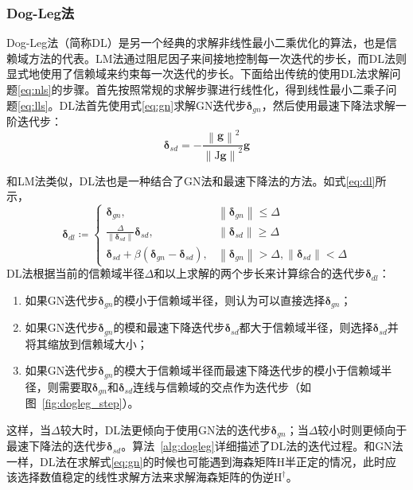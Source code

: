 \subsubsection*{Dog-Leg法}

Dog-Leg法（简称DL）是另一个经典的求解非线性最小二乘优化的算法，也是信赖域方法的代表。LM法通过阻尼因子来间接地控制每一次迭代的步长，而DL法则显式地使用了信赖域来约束每一次迭代的步长。下面给出传统的使用DL法求解问题\eqref{eq:nls}的步骤\citep{tingleff2004methods}。首先按照常规的求解步骤进行线性化，得到线性最小二乘子问题\eqref{eq:lls}。DL法首先使用式\eqref{eq:gn}求解GN迭代步$\bm{\delta}_{gn}$，然后使用最速下降法求解一阶迭代步：
\begin{equation}
    \bm{\delta}_{sd} = -\frac{\left\|\bm{g}\right\|^2}
                             {\left\|\mathrm{J}\bm{g}\right\|^2} \bm{g}
    \label{eq:sd}
\end{equation}

和LM法类似，DL法也是一种结合了GN法和最速下降法的方法。如式\eqref{eq:dl}所示，
\begin{equation}
    \bm{\delta}_{dl} \coloneqq \left\{
        \begin{array}{lll}
            \bm{\delta}_{gn}, & \left\|\bm{\delta}_{gn}\right\| \leq \Delta \\
            \frac{\Delta}{\left\|\bm{\delta}_{sd}\right\|}\bm{\delta}_{sd}, &
            \left\|\bm{\delta}_{sd}\right\| \geq \Delta \\
            \bm{\delta}_{sd} + \beta(\bm{\delta}_{gn}-\bm{\delta}_{sd}), &
            \left\|\bm{\delta}_{gn}\right\| > \Delta,
            \left\|\bm{\delta}_{sd}\right\| < \Delta
        \end{array}
    \right.
    \label{eq:dl}
\end{equation}
DL法根据当前的信赖域半径$\Delta$和以上求解的两个步长来计算综合的迭代步$\bm{\delta}_{dl}$：
\begin{enumerate}
    \item 如果GN迭代步$\bm{\delta}_{gn}$的模小于信赖域半径，则认为可以直接选择$\bm{\delta}_{gn}$；
    \item 如果GN迭代步$\bm{\delta}_{gn}$的模和最速下降迭代步$\bm{\delta}_{sd}$都大于信赖域半径，则选择$\bm{\delta}_{sd}$并将其缩放到信赖域大小；
    \item 如果GN迭代步$\bm{\delta}_{gn}$的模大于信赖域半径而最速下降迭代步的模小于信赖域半径，则需要取$\bm{\delta}_{gn}$和$\bm{\delta}_{sd}$连线与信赖域的交点作为迭代步（如图~\ref{fig:dogleg_step}）。
\end{enumerate}
这样，当$\Delta$较大时，DL法更倾向于使用GN法的迭代步$\bm{\delta}_{gn}$；当$\Delta$较小时则更倾向于最速下降法的迭代步$\bm{\delta}_{sd}$。算法~\ref{alg:dogleg}详细描述了DL法的迭代过程。和GN法一样，DL法在求解式\eqref{eq:gn}的时候也可能遇到海森矩阵$\mathrm{H}$半正定的情况，此时应该选择数值稳定的线性求解方法来求解海森矩阵的伪逆$\mathrm{H}^\dag$。

